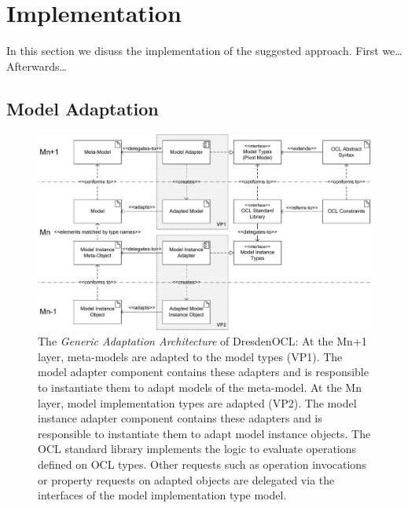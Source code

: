 \section{Implementation}

	In this section we disuss the implementation of the suggested approach.
	First we\ldots Afterwards\ldots

\subsection{Model Adaptation}

	\begin{figure}[tb]
			\centering
				\includegraphics[width=1.00\textwidth]{figures/modeladaptation.pdf}
			\caption{
			The \textit{Generic Adaptation Architecture} of DresdenOCL: At the Mn+1 layer, meta-models are adapted
			to the model types (VP1). The model adapter component contains these adapters and is responsible 
			to instantiate them to adapt models of the meta-model. 
			At the Mn layer, model implementation types are adapted (VP2). The model instance adapter component
			contains these adapters and is responsible to instantiate them to adapt model instance objects. 
			The OCL standard library implements the logic to evaluate operations defined on OCL types. Other 
			requests such as operation invocations or property requests on adapted objects are delegated 
			via the interfaces of the model implementation type model.}
			\label{fig:modeladaptation}
		\end{figure}

